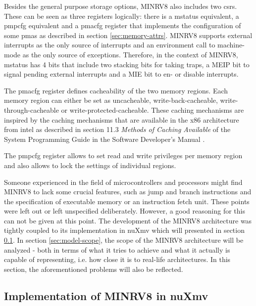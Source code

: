 Besides the general purpose storage options, MINRV8 also includes two \glspl{csr}.
These can be seen as three registers logically: there is a \gls{mstatus} equivalent, a \gls{pmpcfg} equivalent and a \gls{pmacfg} register that implements the configuration of some \glspl{pma} as described in section \ref{sec:memory-attrs}.
MINRV8 supports external interrupts as the only source of interrupts and an environment call to machine-mode as the only source of exceptions.
Therefore, in the context of MINRV8, \gls{mstatus} has 4 bits that include two stacking bits for taking traps, a MEIP bit to signal pending external interrupts and a MIE bit to en- or disable interrupts.

The \gls{pmacfg} register defines cacheability of the two memory regions.
Each memory region can either be set as uncacheable, write-back-cacheable, write-through-cacheable or write-protected-cacheable.
These caching mechanisms are inspired by the caching mechanisms that are available in the x86 architecture from intel as described in section 11.3 \textit{Methods of Caching Available} of the System Programming Guide in the Software Developer's Manual \cite{IntelSystemProgramming}.

The \gls{pmpcfg} register allows to set read and write privileges per memory region and also allows to lock the settings of individual regions.

Someone experienced in the field of microcontrollers and processors might find MINRV8 to lack some crucial features, such as jump and branch instructions and the specification of executable memory or an instruction fetch unit.
These points were left out or left unspecified deliberately.
However, a good reasoning for this can not be given at this point.
The development of the MINRV8 architecture was tightly coupled to its implementation in nuXmv which will presented in section \ref{sec:model-implementation}.
In section \ref{sec:model-scope}, the scope of the MINRV8 architecture will be analyzed - both in terms of what it tries to achieve and what it actually is capable of representing, i.e. how close it is to real-life architectures.
In this section, the aforementioned problems will also be reflected.

\subsection{Implementation of MINRV8 in nuXmv}
\label{sec:model-implementation}

